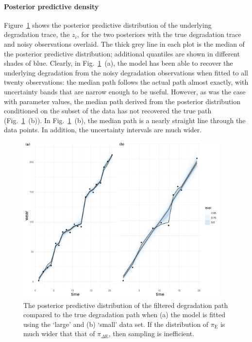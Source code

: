 \paragraph*{Posterior predictive density}
Figure~\ref{fig:ppd-z} shows the posterior predictive distribution of the underlying degradation trace, the $z_i$, for the two posteriors with the true degradation trace and noisy observations overlaid. The thick grey line in each plot is the median of the posterior predictive distribution; additional quantiles are shown in different shades of blue. Clearly, in Fig.~\ref{fig:ppd-z}~(a), the model has been able to recover the underlying degradation from the noisy degradation observations when fitted to all twenty observations: the median path follows the actual path almost exactly, with uncertainty bands that are narrow enough to be useful. However, as was the case with parameter values, the median path derived from the posterior distribution conditioned on the subset of the data has not recovered the true path (Fig.~\ref{fig:ppd-z}~(b)). In Fig.~\ref{fig:ppd-z}~(b), the median path is a nearly straight line through the data points. In addition, the uncertainty intervals are much wider.

\begin{figure}[tbp]
  \centering
  \includegraphics[width=0.95\textwidth]{./figures/ch-4/ppd_z_a.pdf}
  \caption{The posterior predictive distribution of the filtered degradation path compared to the true degradation path when (a) the model is fitted using the `large' and (b) `small' data set. If the distribution of $\pi_\text{E}$ is much wider that that of $\pi_{\Delta\text{E}}$, then sampling is inefficient.}
  \label{fig:ppd-z}
\end{figure}

